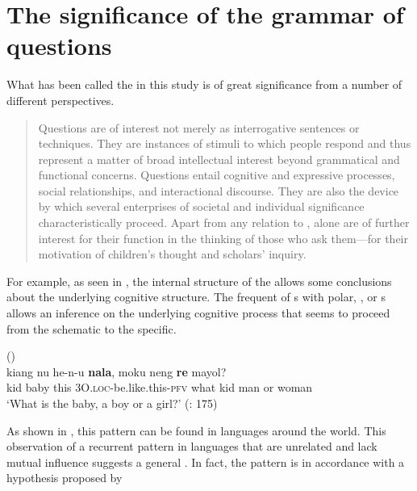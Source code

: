 \section{The significance of the grammar of questions}\label{sec:6.3}

What has been called the \textit{} in this study is of great significance from a number of different perspectives.

\begin{quote}
Questions are of interest not merely as interrogative sentences or techniques. They are instances of stimuli to which people respond and thus represent a matter of broad intellectual interest beyond grammatical and functional concerns. Questions entail cognitive and expressive processes, social relationships, and interactional discourse. They are also the device by which several enterprises of societal and individual significance characteristically proceed. Apart from any relation to ,  alone are of further interest for their function in the thinking of those who ask them—for their motivation of children’s thought and scholars’ inquiry. \citep[162]{Dillon1982}
\end{quote}

  
 
\noindent For example, as seen in , the internal structure of the  allows some conclusions about the underlying cognitive structure. The frequent  of s with polar, , or s allows an inference on the underlying cognitive process that seems to proceed from the schematic to the specific.

\ea%
 ()\\
    \label{ex:key:1}
     {kiang} {nu} {he-n-u} \textbf{{nala}}, {moku} {neng} \textbf{{r}}\textbf{{e}} {mayol?}\\
     kid  baby  this  3O.\textsc{loc}{}-be.like.this{}-\textsc{pfv}  what  kid  man  or  woman \\
    \glt ‘What is the baby, a boy or a girl?’ (\citealt{Kratochvíl2007}: 175)
    \z

\noindent As shown in , this pattern can be found in languages around the world. This observation of a recurrent pattern in languages that are unrelated and lack mutual influence suggests a general . In fact, the pattern is in accordance with a hypothesis proposed by \citet[1235]{Bar2009}

